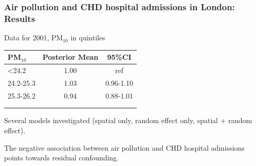 \documentclass[slidestop,compress,serif,10pt]{beamer}
\begin{document}
\begin{frame}
\frametitle{Air pollution and CHD hospital admissions in London: Results}

Data for 2001, PM$_{10}$ in quintiles

\vspace{10pt}
\begin{center}\begin{tabular}{lcc}
\hline
PM$_{10}$ & Posterior Mean & 95\%CI\\
\hline
<24.2 & 1.00 & ref\\
24.2-25.3 & 1.03 & 0.96-1.10\\
25.3-26.2 & 0.94 & 0.88-1.01\\
\color{red}{26.2-27.5} & \color{red}{0.88} & \color{red}{0.81-0.94}\\
\color{red}{>27.5}     & \color{red}{0.75} & \color{red}{0.70-0.81}\\
\hline
\end{tabular}\end{center}


\vspace{5pt} Several models investigated (spatial only, random effect only, spatial + random effect).

\vspace{5pt} The negative association between air pollution and CHD hospital admissions points towards {\color{red} residual confounding}.

\end{frame}
\end{document}
